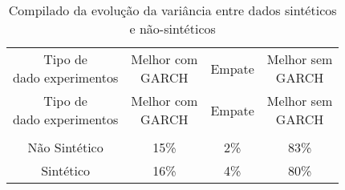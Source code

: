  \begin{center}
\begin{longtable}{cccc}
\toprule
\rowcolor{white}
 \caption{Compilado da evolução da variância entre dados sintéticos e
 não-sintéticos} \label{Tabela:EvolucaoVarianciaSinteticoOuNaoSintetico} \\
\midrule
\rowcolor{white}
   \specialcell{Tipo de\\dado experimentos} & \specialcell{Melhor com\\GARCH} &
   Empate & \specialcell{Melhor sem\\GARCH} \\
\midrule
\endfirsthead
\midrule
\rowcolor{white}
   \specialcell{Tipo de\\dado experimentos} & \specialcell{Melhor com\\GARCH} &
   Empate & \specialcell{Melhor sem\\GARCH} \\
\toprule
\endhead
\midrule \\ %
\endfoot
\bottomrule
\endlastfoot
    Não Sintético & 15\%  & 2\%   & 83\% \\
    Sintético & 16\%  & 4\%   & 80\% \\
\end{longtable}
\end{center}